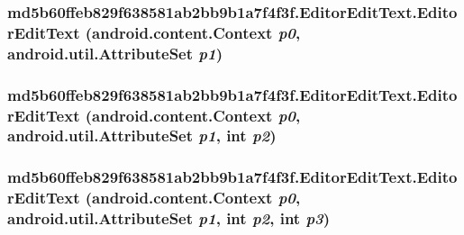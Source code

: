 \hypertarget{classmd5b60ffeb829f638581ab2bb9b1a7f4f3f_1_1_editor_edit_text_cecda8e695b3aabe8c8cf239e9a086c4}{
\subsubsection[{EditorEditText}]{\setlength{\rightskip}{0pt plus 5cm}md5b60ffeb829f638581ab2bb9b1a7f4f3f.EditorEditText.EditorEditText (android.content.Context {\em p0}, \/  android.util.AttributeSet {\em p1})}}
\label{classmd5b60ffeb829f638581ab2bb9b1a7f4f3f_1_1_editor_edit_text_cecda8e695b3aabe8c8cf239e9a086c4}


\hypertarget{classmd5b60ffeb829f638581ab2bb9b1a7f4f3f_1_1_editor_edit_text_0f6e1c351c540635b51c75ed5cc7ef59}{
\subsubsection[{EditorEditText}]{\setlength{\rightskip}{0pt plus 5cm}md5b60ffeb829f638581ab2bb9b1a7f4f3f.EditorEditText.EditorEditText (android.content.Context {\em p0}, \/  android.util.AttributeSet {\em p1}, \/  int {\em p2})}}
\label{classmd5b60ffeb829f638581ab2bb9b1a7f4f3f_1_1_editor_edit_text_0f6e1c351c540635b51c75ed5cc7ef59}


\hypertarget{classmd5b60ffeb829f638581ab2bb9b1a7f4f3f_1_1_editor_edit_text_a96dd97388dccea5ef79dc06281b4d07}{
\subsubsection[{EditorEditText}]{\setlength{\rightskip}{0pt plus 5cm}md5b60ffeb829f638581ab2bb9b1a7f4f3f.EditorEditText.EditorEditText (android.content.Context {\em p0}, \/  android.util.AttributeSet {\em p1}, \/  int {\em p2}, \/  int {\em p3})}}
\label{classmd5b60ffeb829f638581ab2bb9b1a7f4f3f_1_1_editor_edit_text_a96dd97388dccea5ef79dc06281b4d07}




